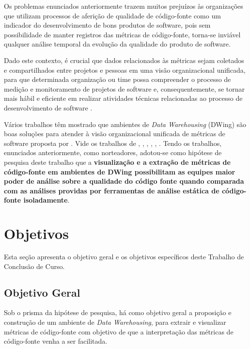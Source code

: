 Os problemas enunciados anteriormente trazem muitos prejuízos às organizações que 
utilizam processos de aferição de qualidade de código-fonte como um indicador do desenvolvimento de bons produtos de software, pois sem possibilidade de manter registros das métricas de código-fonte, torna-se inviável qualquer análise temporal da evolução da qualidade do produto de software. 

Dado este contexto, é crucial que dados relacionados às métricas sejam 
coletados e compartilhados entre projetos e pessoas em uma visão organizacional unificada, para que determinada organização ou time possa compreender o processo de medição e monitoramento de projetos de software e, 
consequentemente, se tornar mais hábil e eficiente em realizar atividades 
técnicas relacionadas ao processo de desenvolvimento de software 
\cite{Chulani2003}. 



Vários trabalhos têm mostrado que ambientes de \textit{Data Warehousing} 
(DWing) são boas soluções para atender à visão organizacional unificada de 
métricas de software proposta por . Vide os trabalhos 
de , , ,
, , . 
Tendo os trabalhos, enunciados anteriormente, como norteadores, adotou-se como 
hipótese de pesquisa deste trabalho que a \textbf{visualização e a extração 
de métricas de código-fonte em ambientes de DWing possibilitam as equipes maior poder de análise sobre a qualidade do código fonte quando comparada com as análises providas por ferramentas de análise estática de código-fonte isoladamente}. 








\section{Objetivos}

Esta seção apresenta o objetivo geral e os objetivos específicos deste Trabalho de Conclusão de Curso.

\subsection{Objetivo Geral}
Sob o prisma da hipótese de pesquisa, há como objetivo geral a proposição e 
construção de um ambiente de \textit{Data Warehousing}, para extrair e visualizar métricas de código-fonte com objetivo de que a interpretação das métricas de código-fonte venha a ser facilitada.

